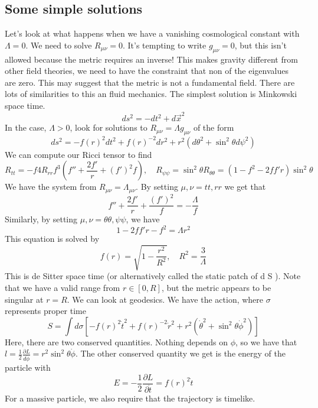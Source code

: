 \subsection{Some simple solutions} 
Let's look at what happens when we have a vanishing 
cosmological constant with $ \Lambda  =0 $. 
We need to solve  $ R_{ \mu \nu }  = 0$. 
It's tempting to write $ g _{ \mu \nu } = 0 $, 
but this isn't allowed because the metric requires an inverse! 
This makes gravity different from other field theories, 
we need to have the constraint that non of the eigenvalues are zero. 
This may suggest that the metric is not a fundamental field. There 
are lots of similarities to this an fluid mechanics. 
The simplest solution is Minkowski space time. 
\[
 ds ^ 2 = - d t ^ 2 + d \vec{x} ^ 2 
\] 
In the case, $ \Lambda > 0 $, look for solutions 
to $ R _{ \mu \nu }  = \Lambda g_{ \mu \nu }$ of the form 
\[
	d s^ 2 = - f (r ) ^ 2 d t ^ 2 + f ( r ) ^{ - 2} dr ^ 2 + r ^ 2 ( d \theta ^ 2 
	+ \sin^ 2 \theta d \psi ^ 2 ) 
\] 
We can compute our Ricci tensor 
to find 
\[
	R _{ t t }  =  - f 4 R_{ rr } f ^  3 ( f '' + \frac{2 f ' }{ r } + ( f ' ) ^2 f ), \quad 
	R_{ \psi \psi }  = \sin ^ 2 \theta R _{ \theta \theta  } = ( 1 - f ^ 2 - 2 f f ' r ) \sin ^ 2 \theta 
\] 
We have the system from $ R_{ \mu \nu } = \Lambda _{ \mu \nu } $. 
By setting $ \mu , \nu = t t , r r $ we get that 
 \[
	 f '' + \frac{2 f ' }{ r } + \frac{ ( f ' ) ^ 2 }{ f }  = - \frac{\Lambda }{ f }
\] 
Similarly, by setting $ \mu,  \nu = \theta \theta , \psi \psi  $, we have 
\[
 1 - 2 f f ' r - f ^ 2 = \Lambda r ^ 2 
\] This equation is solved by 
\[
 f ( r)  = \sqrt{ 1 - \frac{ r ^ 2 }{ R ^ 2 }} , \quad R ^ 2 = \frac{ 3 }{ \Lambda}
\] This is de Sitter space time (or alternatively called the static patch of 
d S ). Note that we have a valid range from $ r \in [ 0 , R ] $, but the 
metric appears to be singular at $ r = R $. 
We can look at geodesics. We have the action, where $ \sigma $ represents proper time 
\[
 S  = \int d \sigma \left[  
 - f ( r) ^ 2 \dot{t } ^ 2 + f ( r) ^{ - 2 } \dot{ r } ^ 2 
 + r ^ 2 \left(  \dot{ \theta } ^ 2 + \sin ^ 2 \theta \dot{ \phi  }  ^ 2  \right)  \right] 
\] Here, 
there are two conserved quantities. Nothing depends on $ \phi $, 
so we have that 
$ l = \frac{1}{2 } \frac{\partial  L }{ d \dot{\phi }  } = r ^ 2 \sin ^ 2 \theta \dot{\phi  } $. 
The other conserved quantity we get is the energy of the particle with 
\[
	E =  - \frac{1}{2 } \frac{\partial  L }{\partial  \dot{ t } } = f ( r) ^ 2 
	\dot{t }  
\] For a massive particle, 
we also require that the trajectory is timelike.
